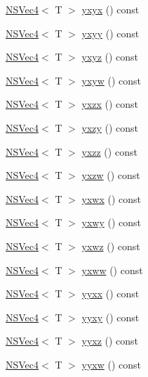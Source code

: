 \begin{DoxyCompactItemize}
\item 
\hyperlink{structNSVec4}{N\-S\-Vec4}$<$ T $>$ \hyperlink{structNSVec4_adff4fde28d03674b6052b2013e48b3e5}{yxyx} () const 
\item 
\hyperlink{structNSVec4}{N\-S\-Vec4}$<$ T $>$ \hyperlink{structNSVec4_a679bdcc841d1b6ac766d857f0b77b8a5}{yxyy} () const 
\item 
\hyperlink{structNSVec4}{N\-S\-Vec4}$<$ T $>$ \hyperlink{structNSVec4_a8ff890718077f2be07aa4e97546b7d15}{yxyz} () const 
\item 
\hyperlink{structNSVec4}{N\-S\-Vec4}$<$ T $>$ \hyperlink{structNSVec4_a71987ff04d73d869d18c44144f3b0b6a}{yxyw} () const 
\item 
\hyperlink{structNSVec4}{N\-S\-Vec4}$<$ T $>$ \hyperlink{structNSVec4_a873021f3e1b86aa466369cc2a32971fe}{yxzx} () const 
\item 
\hyperlink{structNSVec4}{N\-S\-Vec4}$<$ T $>$ \hyperlink{structNSVec4_a3af61ff8b89e8111d6e669c82bf66440}{yxzy} () const 
\item 
\hyperlink{structNSVec4}{N\-S\-Vec4}$<$ T $>$ \hyperlink{structNSVec4_a24d75b9fdf211a84441806947dd4eb4e}{yxzz} () const 
\item 
\hyperlink{structNSVec4}{N\-S\-Vec4}$<$ T $>$ \hyperlink{structNSVec4_a001fa9035ed20fd1437c65123aa9996b}{yxzw} () const 
\item 
\hyperlink{structNSVec4}{N\-S\-Vec4}$<$ T $>$ \hyperlink{structNSVec4_a7cdf4f691177979b2596b179ee697cbf}{yxwx} () const 
\item 
\hyperlink{structNSVec4}{N\-S\-Vec4}$<$ T $>$ \hyperlink{structNSVec4_abc51b593e8375ff78461d0cd5bd2d7ed}{yxwy} () const 
\item 
\hyperlink{structNSVec4}{N\-S\-Vec4}$<$ T $>$ \hyperlink{structNSVec4_a8882c2ac3b5a3a8d96ddc12167657e4a}{yxwz} () const 
\item 
\hyperlink{structNSVec4}{N\-S\-Vec4}$<$ T $>$ \hyperlink{structNSVec4_a85446288f7518cbed6b4c9736640d683}{yxww} () const 
\item 
\hyperlink{structNSVec4}{N\-S\-Vec4}$<$ T $>$ \hyperlink{structNSVec4_a615b6fcde51dc45461138704ee3f6c2b}{yyxx} () const 
\item 
\hyperlink{structNSVec4}{N\-S\-Vec4}$<$ T $>$ \hyperlink{structNSVec4_a5532c9cfd94754f3b7a27c5ee815cb62}{yyxy} () const 
\item 
\hyperlink{structNSVec4}{N\-S\-Vec4}$<$ T $>$ \hyperlink{structNSVec4_a061bb825a00ca4fd564b1d7218802ab7}{yyxz} () const 
\item 
\hyperlink{structNSVec4}{N\-S\-Vec4}$<$ T $>$ \hyperlink{structNSVec4_ac33a352d42ba41e4c1cf0ca079d34bb8}{yyxw} () const 

\end{DoxyCompactItemize}
